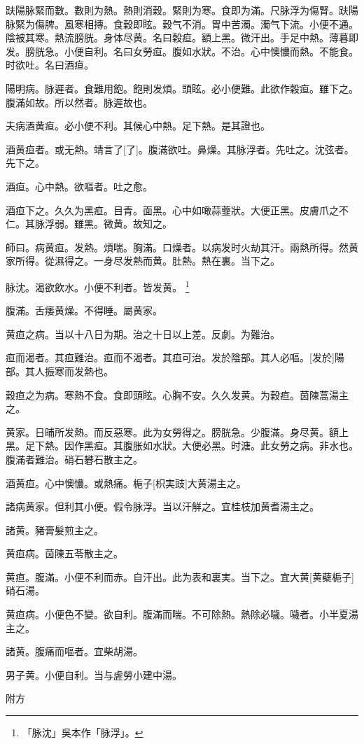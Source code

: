 \documentclass[12pt,twoside,UTF8,b5paper]{ctexbook}
\begin{document}
趺陽脉緊而數。數則为熱。熱則消穀。緊則为寒。食即为滿。尺脉浮为傷腎。趺陽脉緊为傷脾。風寒相摶。食穀即眩。穀气不消。胃中苦濁。濁气下流。小便不通。陰被其寒。熱流膀胱。身体尽黄。名曰穀疸。額上黑。微汗出。手足中熱。薄暮即发。膀胱急。小便自利。名曰女勞疸。腹如水狀。不治。心中懊憹而熱。不能食。时欲吐。名曰酒疸。

陽明病。脉遲者。食難用飽。飽則发煩。頭眩。必小便難。此欲作穀疸。雖下之。腹滿如故。所以然者。脉遲故也。

夫病酒黄疸。必小便不利。其候心中熱。足下熱。是其證也。

酒黄疸者。或无熱。靖言了[了]。腹滿欲吐。鼻燥。其脉浮者。先吐之。沈弦者。先下之。

酒疸。心中熱。欲嘔者。吐之愈。

酒疸下之。久久为黑疸。目青。面黑。心中如噉蒜虀狀。大便正黑。皮膚爪之不仁。其脉浮弱。雖黑。微黄。故知之。

師曰。病黄疸。发熱。煩喘。胸滿。口燥者。以病发时火劫其汗。兩熱所得。然黄家所得。從濕得之。一身尽发熱而黄。肚熱。熱在裏。当下之。

脉沈。渴欲飲水。小便不利者。皆发黄。
	\footnote{「脉沈」吳本作「脉浮」。}

腹滿。舌痿黄燥。不得睡。屬黄家。

黄疸之病。当以十八日为期。治之十日以上差。反劇。为難治。

疸而渴者。其疸難治。疸而不渴者。其疸可治。发於陰部。其人必嘔。[发於]陽部。其人振寒而发熱也。

穀疸之为病。寒熱不食。食即頭眩。心胸不安。久久发黄。为穀疸。茵陳蒿湯主之。

黄家。日晡所发熱。而反惡寒。此为女勞得之。膀胱急。少腹滿。身尽黄。額上黑。足下熱。因作黑疸。其腹胀如水狀。大便必黑。时溏。此女勞之病。非水也。腹滿者難治。硝石礬石散主之。

酒黄疸。心中懊憹。或熱痛。梔子[枳実豉]大黄湯主之。

諸病黄家。但利其小便。假令脉浮。当以汗觧之。宜桂枝加黄耆湯主之。

諸黄。豬膏髮煎主之。

黄疸病。茵陳五苓散主之。

黄疸。腹滿。小便不利而赤。自汗出。此为表和裏実。当下之。宜大黄[黄蘗梔子]硝石湯。

黄疸病。小便色不變。欲自利。腹滿而喘。不可除熱。熱除必噦。噦者。小半夏湯主之。

諸黄。腹痛而嘔者。宜柴胡湯。

男子黄。小便自利。当与虗勞小建中湯。

附方
\end{document}
